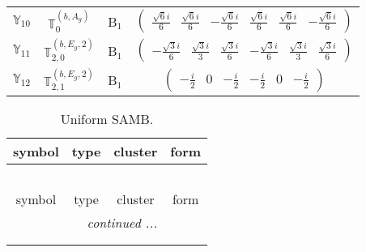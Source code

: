 \documentclass[fleqn,10pt,landscape]{article}
\begin{document}
\begin{itemize}
\begin{center}
\begin{longtable}{c|c|c|c}
$ \mathbb{Y}_{10} $ & $\mathbb{T}_{0}^{(b,A_{g})}$ & B$_{1}$ & $\begin{pmatrix} \frac{\sqrt{6} i}{6} & \frac{\sqrt{6} i}{6} & - \frac{\sqrt{6} i}{6} & \frac{\sqrt{6} i}{6} & \frac{\sqrt{6} i}{6} & - \frac{\sqrt{6} i}{6} \end{pmatrix}$ \\
$ \mathbb{Y}_{11} $ & $\mathbb{T}_{2,0}^{(b,E_{g},2)}$ & B$_{1}$ & $\begin{pmatrix} - \frac{\sqrt{3} i}{6} & \frac{\sqrt{3} i}{3} & \frac{\sqrt{3} i}{6} & - \frac{\sqrt{3} i}{6} & \frac{\sqrt{3} i}{3} & \frac{\sqrt{3} i}{6} \end{pmatrix}$ \\
$ \mathbb{Y}_{12} $ & $\mathbb{T}_{2,1}^{(b,E_{g},2)}$ & B$_{1}$ & $\begin{pmatrix} - \frac{i}{2} & 0 & - \frac{i}{2} & - \frac{i}{2} & 0 & - \frac{i}{2} \end{pmatrix}$ \\
\end{longtable}
\end{center}
\begin{center}
\renewcommand{\arraystretch}{1.3}
\begin{longtable}{c|c|c|c}
\caption{Uniform SAMB.}
 \\
 \hline \hline
symbol & type & cluster & form \\ \hline \endfirsthead

\multicolumn{3}{l}{\tablename\ \thetable{}} \\
 \hline \hline
symbol & type & cluster & form \\ \hline \endhead

 \hline \hline
\multicolumn{3}{r}{\footnotesize\it continued ...} \\ \endfoot

 \hline \hline
\multicolumn{3}{r}{} \\ \endlastfoot


\end{longtable}
\end{center}
\end{itemize}
\end{document}
